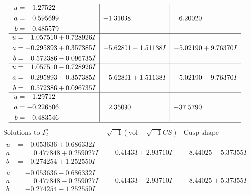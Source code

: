 \documentclass[1p]{elsarticle_modified}
\theoremstyle{definition}
\newcommand{\I}{\sqrt{-1}}
\begin{document}
$$\begin{array}{c|c|c}
\begin{aligned}
u &= \phantom{-}1.27522\phantom{ +0.000000I} \\
a &= \phantom{-}0.595699\phantom{ +0.000000I} \\
b &= \phantom{-}0.485579\phantom{ +0.000000I}\end{aligned}
 & -1.31038\phantom{ +0.000000I} & \phantom{-}6.20020\phantom{ +0.000000I} \\ \hline\begin{aligned}
u &= \phantom{-}1.057510 + 0.728926 I \\
a &= -0.295893 + 0.357385 I \\
b &= \phantom{-}0.572386 - 0.096735 I\end{aligned}
 & -5.62801 - 1.51138 I & -5.02190 + 9.76370 I \\ \hline\begin{aligned}
u &= \phantom{-}1.057510 - 0.728926 I \\
a &= -0.295893 - 0.357385 I \\
b &= \phantom{-}0.572386 + 0.096735 I\end{aligned}
 & -5.62801 + 1.51138 I & -5.02190 - 9.76370 I \\ \hline\begin{aligned}
u &= -1.29712\phantom{ +0.000000I} \\
a &= -0.226506\phantom{ +0.000000I} \\
b &= -0.483546\phantom{ +0.000000I}\end{aligned}
 & \phantom{-}2.35090\phantom{ +0.000000I} & -37.5790\phantom{ +0.000000I}\\
 \hline 
 \end{array}$$\newpage$$\begin{array}{c|c|c}  
\text{Solutions to }I^u_{2}& \I (\text{vol} + \sqrt{-1}CS) & \text{Cusp shape}\\
 \hline 
\begin{aligned}
u &= -0.053636 + 0.686332 I \\
a &= \phantom{-}0.477848 + 0.259027 I \\
b &= -0.274254 + 1.252550 I\end{aligned}
 & \phantom{-}0.41433 + 2.93710 I & -8.44025 - 5.37355 I \\ \hline\begin{aligned}
u &= -0.053636 - 0.686332 I \\
a &= \phantom{-}0.477848 - 0.259027 I \\
b &= -0.274254 - 1.252550 I\end{aligned}
 & \phantom{-}0.41433 - 2.93710 I & -8.44025 + 5.37355 I \\ \hline\begin{aligned}

\end{aligned}
\end{array}$$
\end{document}
